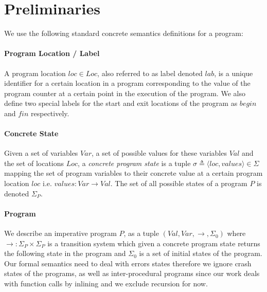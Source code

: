 \section{Preliminaries} 
We use the following standard concrete semantics definitions for a program:

\paragraph{Program Location / Label} 
A program location $loc \in Loc$, also referred to as label denoted $lab$, is a unique identifier for a certain location in a program corresponding to the value of the program counter at a certain point in the execution of the program. We also define two special labels for the start and exit locations of the program as $begin$ and $fin$ respectively.

\paragraph{Concrete State} 
Given a set of variables $Var$, a set of possible values for these variables $Val$ and the set of locations $Loc$, a \emph{concrete program state} is a tuple $\sigma \triangleq \langle loc, values \rangle \in \Sigma$ mapping the set of program variables to their concrete value at a certain program location $loc$ i.e. $values : Var \rightarrow Val$. The set of all possible states of a program $P$ is denoted $\Sigma_{P}$.

\paragraph{Program} 
We describe an imperative program $P$, as a tuple $(Val,Var,\rightarrow,\Sigma_{0})$ where $\rightarrow : \Sigma_{P} \times \Sigma_{P} $  is a transition system which given a concrete program state returns the following state in the program and $\Sigma_{0}$ is a set of initial states of the program. Our formal semantics need to deal with errors states therefore we ignore crash states of the programs, as well as inter-procedural programs since our work deals with function calls by inlining and we exclude recursion for now.

